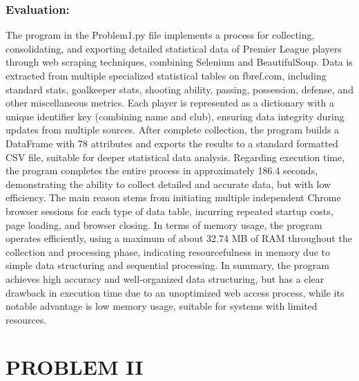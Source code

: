 \documentclass[12pt]{report}
\begin{document}
{\subsection{Evaluation:} %
The program in the Problem1.py file implements a process for collecting, consolidating, and exporting detailed statistical data of Premier League players through web scraping techniques, combining Selenium and BeautifulSoup. Data is extracted from multiple specialized statistical tables on fbref.com, including standard stats, goalkeeper stats, shooting ability, passing, possession, defense, and other miscellaneous metrics. Each player is represented as a dictionary with a unique identifier key (combining name and club), ensuring data integrity during updates from multiple sources. After complete collection, the program builds a DataFrame with 78 attributes and exports the results to a standard formatted CSV file, suitable for deeper statistical data analysis. Regarding execution time, the program completes the entire process in approximately 186.4 seconds, demonstrating the ability to collect detailed and accurate data, but with low efficiency. The main reason stems from initiating multiple independent Chrome browser sessions for each type of data table, incurring repeated startup costs, page loading, and browser closing. In terms of memory usage, the program operates efficiently, using a maximum of about 32.74 MB of RAM throughout the collection and processing phase, indicating resourcefulness in memory due to simple data structuring and sequential processing. In summary, the program achieves high accuracy and well-organized data structuring, but has a clear drawback in execution time due to an unoptimized web access process, while its notable advantage is low memory usage, suitable for systems with limited resources.
\clearpage
\chapter{PROBLEM II} %
{
}}
\end{document}
